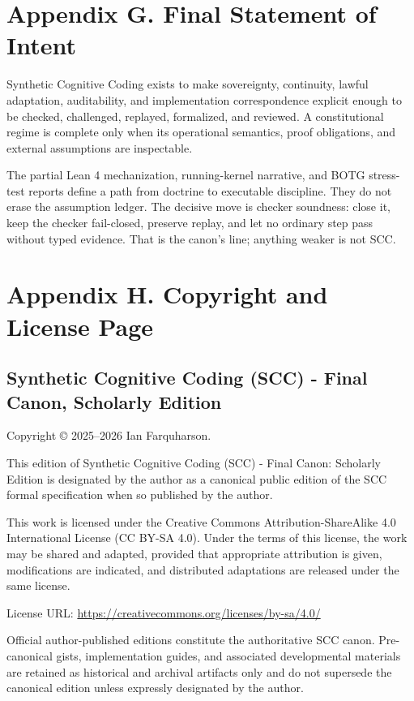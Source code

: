 \documentclass[10pt,oneside]{article}
\theoremstyle{definition}
\theoremstyle{remark}
\begin{document}
\section{Appendix G. Final Statement of Intent}
Synthetic Cognitive Coding exists to make sovereignty, continuity, lawful adaptation, auditability, and implementation correspondence explicit enough to be checked, challenged, replayed, formalized, and reviewed. A constitutional regime is complete only when its operational semantics, proof obligations, and external assumptions are inspectable.

The partial Lean 4 mechanization, running-kernel narrative, and BOTG stress-test reports define a path from doctrine to executable discipline. They do not erase the assumption ledger. The decisive move is checker soundness: close it, keep the checker fail-closed, preserve replay, and let no ordinary step pass without typed evidence. That is the canon's line; anything weaker is not SCC.

\section{Appendix H. Copyright and License Page}
\subsection*{Synthetic Cognitive Coding (SCC) - Final Canon, Scholarly Edition}
Copyright \copyright{} 2025--2026 Ian Farquharson.

This edition of Synthetic Cognitive Coding (SCC) - Final Canon: Scholarly Edition is designated by the author as a canonical public edition of the SCC formal specification when so published by the author.

This work is licensed under the Creative Commons Attribution-ShareAlike 4.0 International License (CC BY-SA 4.0). Under the terms of this license, the work may be shared and adapted, provided that appropriate attribution is given, modifications are indicated, and distributed adaptations are released under the same license.

License URL: \url{https://creativecommons.org/licenses/by-sa/4.0/}

Official author-published editions constitute the authoritative SCC canon. Pre-canonical gists, implementation guides, and associated developmental materials are retained as historical and archival artifacts only and do not supersede the canonical edition unless expressly designated by the author.
\end{document}

